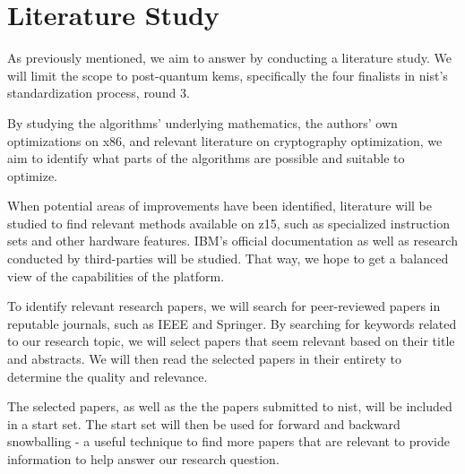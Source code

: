 \section{Literature Study}
\label{section:method:literature-study}

As previously mentioned, we aim to answer  by conducting a literature study. We will limit the scope to post-quantum \glspl{kem}, specifically the four finalists in \gls{nist}'s standardization process, round 3.

By studying the algorithms' underlying mathematics, the authors' own optimizations on \gls{x86}, and relevant literature on cryptography optimization, we aim to identify what parts of the algorithms are possible and suitable to optimize.

When potential areas of improvements have been identified, literature will be studied to find relevant methods available on \gls{z15}, such as specialized instruction sets and other hardware features. IBM's official documentation as well as research conducted by third-parties will be studied. That way, we hope to get a balanced view of the capabilities of the platform.

To identify relevant research papers, we will search for peer-reviewed papers in reputable journals, such as IEEE and Springer. By searching for keywords related to our research topic, we will select papers that seem relevant based on their title and abstracts. We will then read the selected papers in their entirety to determine the quality and relevance.

The selected papers, as well as the the papers submitted to \gls{nist}, will be included in a start set. The start set will then be used for forward and backward snowballing - a useful technique to find more papers that are relevant to provide information to help answer our research question\cite{wohlin2014}.

